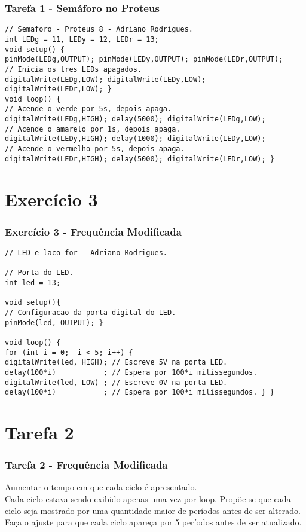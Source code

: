 \documentclass{beamer}
\begin{document}
\begin{frame}[fragile]
	\frametitle{Tarefa 1 - Semáforo no Proteus}
	\begin{lstlisting}[style=Arduino,basicstyle=\scriptsize \ttfamily]
// Semaforo - Proteus 8 - Adriano Rodrigues.
int LEDg = 11, LEDy = 12, LEDr = 13;
void setup() {
pinMode(LEDg,OUTPUT); pinMode(LEDy,OUTPUT); pinMode(LEDr,OUTPUT);
// Inicia os tres LEDs apagados.
digitalWrite(LEDg,LOW); digitalWrite(LEDy,LOW); digitalWrite(LEDr,LOW); }
void loop() {
// Acende o verde por 5s, depois apaga.
digitalWrite(LEDg,HIGH); delay(5000); digitalWrite(LEDg,LOW);
// Acende o amarelo por 1s, depois apaga.
digitalWrite(LEDy,HIGH); delay(1000); digitalWrite(LEDy,LOW);
// Acende o vermelho por 5s, depois apaga.
digitalWrite(LEDr,HIGH); delay(5000); digitalWrite(LEDr,LOW); } \end{lstlisting}
\end{frame}

\section{Exercício 3}
\begin{frame}[fragile]
	\frametitle{Exercício 3 - Frequência Modificada}
	\begin{lstlisting}[style=Arduino,basicstyle=\scriptsize \ttfamily]
// LED e laco for - Adriano Rodrigues.

// Porta do LED.
int led = 13;

void setup(){
// Configuracao da porta digital do LED.
pinMode(led, OUTPUT); }

void loop() {
for (int i = 0;  i < 5; i++) {
digitalWrite(led, HIGH); // Escreve 5V na porta LED.
delay(100*i)           ; // Espera por 100*i milissegundos.
digitalWrite(led, LOW) ; // Escreve 0V na porta LED.
delay(100*i)           ; // Espera por 100*i milissegundos. } } \end{lstlisting}
\end{frame}

\section{Tarefa 2}
\begin{frame}[fragile]
	\frametitle{Tarefa 2 - Frequência Modificada}
	Aumentar o tempo em que cada ciclo é apresentado.\\[10pt]
	Cada ciclo estava sendo exibido apenas uma vez por loop. Propõe-se que cada ciclo seja mostrado por uma quantidade maior de períodos antes de ser alterado.\\[10pt]
	Faça o ajuste para que cada ciclo apareça por 5 períodos antes de ser atualizado.
\end{frame}
\end{document}
